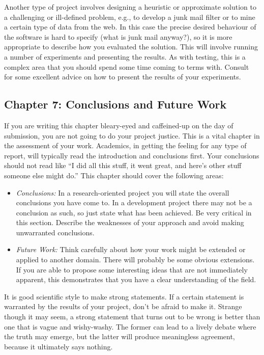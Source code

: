 \documentclass[]{final_report}
\begin{document}
Another type of project involves designing a heuristic or approximate solution to a challenging or ill-defined problem, e.g., to develop a junk mail filter or to mine a certain type of data from the web. In this case the precise desired behaviour of the software is hard to specify (what is junk mail anyway?), so it is more appropriate to describe how you evaluated the solution. This will involve running a number of experiments and presenting the results. As with testing, this is a complex area that you should spend some time coming to terms with. Consult~\cite{DAWSON:2000} for some excellent advice on how to present the results of your experiments.


\subsection{Chapter 7: Conclusions and Future Work}

If you are writing this chapter bleary-eyed and caffeined-up on the day of submission, you are not going to do your project justice. This is a vital chapter in the assessment of your work. Academics, in getting the feeling for any type of report, will typically read the introduction and conclusions first. Your conclusions should not read like ``I did all this stuff, it went great, and here's other stuff someone else might do.'' This chapter should cover the following areas:

\begin{itemize}
\item {\sl Conclusions:} In a research-oriented project you will state the overall conclusions you have come to. In a development project there may not be a conclusion as such, so just state what has been achieved. Be very critical in this section. Describe the weaknesses of your approach and avoid making unwarranted conclusions.
\item {\sl Future Work:} Think carefully about how your work might be extended or applied to another domain. There will probably be some obvious extensions. If you are able to propose some interesting ideas that are not immediately apparent, this demonstrates that you have a clear understanding of the field.
\end{itemize}

It is good scientific style to make strong statements. If a certain statement is warranted by the results of your project, don't be afraid to make it. Strange though it may seem, a strong statement that turns out to be wrong is better than one that is vague and wishy-washy. The former can lead to a lively debate where the truth may emerge, but the latter will produce meaningless agreement, because it ultimately says nothing.
\end{document}
